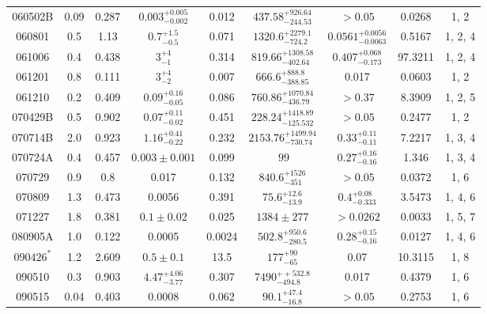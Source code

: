 \documentclass[a4paper,fleqn,usenatbib]{mnras}
\begin{document}
\begin{table*}
{\begin{tabular}[width=1.0 \linewidth]{ccccccccc}
060502B &	0.09 &	0.287 &	$0.003_{-0.002}^{+0.005}$ &	0.012 &	$437.58_{-244.53}^{+926.64}$ &	$>0.05$ &	0.0268 &	1, 2 \\																																																																					060801 &	0.5 &	1.13 &	$0.7_{-0.5}^{+1.5}$ &	0.071 &	$1320.6_{-724.2}^{+2279.1}$ &	$0.0561_{-0.0063}^{+0.0056}$ &	0.5167 &	1, 2, 4 \\ 																																																																					061006 &	0.4 &	0.438 &	$3_{-1}^{+4}$ &	0.314 &	$819.66_{-402.64}^{+1308.58}$ &	$0.407_{-0.173}^{+0.068}$ &	97.3211 &	1, 2, 4 \\ 																																																																					061201 &	0.8 &	0.111 &	$3_{-2}^{+4}$ &	0.007 &	$666.6_{-388.85}^{+888.8}$ &	0.017 &	0.0603 &	1, 2 \\																																																																					061210 &	0.2 &	0.409 &	$0.09_{-0.05}^{+0.16}$ &	0.086 &	$760.86_{-436.79}^{+1070.84}$ &	$>0.37$ &	8.3909 &	1, 2, 5 \\																																																																					070429B &	0.5 &	0.902 &	$0.07_{-0.02}^{+0.11}$ &	0.451 &	$228.24_{-125.532}^{+1418.89}$ &	$>0.05$ &	0.2477 &	1, 2 \\																																																																					070714B &	2.0 &	0.923 &	$1.16_{-0.22}^{+0.41}$ &	0.232 &	$2153.76_{-730.74}^{+1499.94}$ &	$0.33_{-0.11}^{+0.11}$ &	7.2217 &	 1, 3, 4 \\ 																																																																					070724A &	0.4 &	0.457 &	$0.003\pm0.001$ &	0.099 &	$~99$ &	$0.27_{-0.16}^{+0.16}$ &	1.346 &	 1, 3, 4 \\ 																																																																					070729 &	0.9 &	0.8  &	0.017 &	0.132 &	$840.6_{-351}^{+1526}$ &	$>0.05$ &	0.0372 &	1, 6 \\																																																																					070809 &	1.3 &	0.473  &	0.0056 &	0.391 &	$75.6_{-13.9}^{+12.6}$ &	$0.4_{-0.333}^{+0.08}$ &	3.5473 &	 1, 4, 6 \\ 																																																																					071227 &	1.8 &	0.381  &	$0.1\pm 0.02$ &	0.025 &	$1384 \pm 277$ &	$>0.0262$ &	0.0033 &	 1, 5, 7  \\ 																																																																					080905A &	1.0 &	0.122  &	0.0005 &	0.0024 &	$502.8_{-280.5}^{+950.6}$ &	$0.28_{-0.16}^{+0.15}$ &	0.0127 &	 1, 4, 6 \\ 																																																																					$090426^{*}$ &	1.2 &	2.609 &	$0.5\pm0.1$ &	13.5 &	$177 _{-65}^{+90}$ &	0.07 &	10.3115 &	1, 8 \\																																																																					090510 &	0.3 &	0.903  &	$4.47_{-3.77}^{+4.06}$ &	0.307 &	$7490_{-494.8}^{++532.8}$ &	0.017 &	0.4379 &	1, 6 \\																																																																					090515 &	0.04 &	0.403  &	0.0008 &	0.062 &	$90.1_{-16.8}^{+47.4}$ &	$>0.05$ &	0.2753 &	1, 6 
\end{tabular}}
\end{table*}
\end{document}
